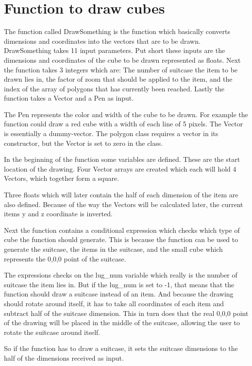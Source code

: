 \section{Function to draw cubes}
The function called DrawSomething is the function which basically converts dimensions and coordinates into the vectors that are to be drawn.
DrawSomething takes 11 input parameters. Put short these inputs are the dimensions and coordinates of the cube to be drawn represented as floats. Next the function takes 3 integers which are: The number of suitcase the item to be drawn lies in, the factor of zoom that should be applied to the item, and the index of the array of polygons that has currently been reached. Lastly the function takes a Vector and a Pen as input.

The Pen represents the color and width of the cube to be drawn. For example the function could draw a red cube with a width of each line of 5 pixels. The Vector is essentially a dummy-vector. The polygon class requires a vector in its constructor, but the Vector is set to zero in the class.

In the beginning of the function some variables are defined. These are the start location of the drawing. Four Vector arrays are created which each will hold 4 Vectors, which together form a square.

Three floats which will later contain the half of each dimension of the item are also defined.
Because of the way the Vectors will be calculated later, the current items y and z coordinate is inverted. 

Next the function contains a conditional expression which checks which type of cube the function should generate. This is because the function can be used to generate the suitcase, the items in the suitcase, and the small cube which represents the 0,0,0 point of the suitcase. 

The expressions checks on the lug\_num variable which really is the number of suitcase the item lies in. But if the lug\_num is set to -1, that means that the function should draw a suitcase instead of an item. And because the drawing should rotate around itself, it has to take all coordinates of each item and subtract half of the suitcase dimension. This in turn does that the real 0,0,0 point of the drawing will be placed in the middle of the suitcase, allowing the user to rotate the suitcase around itself.

So if the function has to draw a suitcase, it sets the suitcase dimensions to the half of the dimensions received as input.

